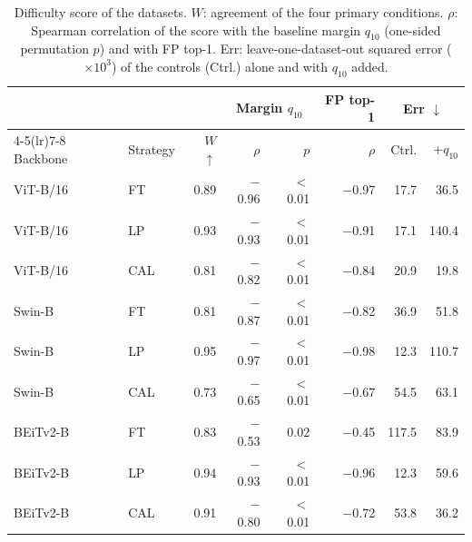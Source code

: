 \begin{table}[t]
\centering
\caption{Difficulty score of the {} datasets. $W$: agreement of the four primary conditions. $\rho$: Spearman correlation of the score with the baseline margin $q_{10}$ (one-sided permutation $p$) and with FP top-1. Err: leave-one-dataset-out squared error ($\times 10^{3}$) of the controls (Ctrl.) alone and with $q_{10}$ added.}
\label{tab:gates}
\setlength{\tabcolsep}{1.8pt}
\small
\begin{tabular}{llrrrrrr}
\toprule
 & & & \multicolumn{2}{c}{Margin $q_{10}$} & FP top-1 & \multicolumn{2}{c}{Err $\downarrow$} \\
\cmidrule(lr){4-5}\cmidrule(lr){7-8}
Backbone & Strategy & $W$ $\uparrow$ & $\rho$ & $p$ & $\rho$ & Ctrl. & +$q_{10}$ \\
\midrule
ViT-B/16 & FT & 0.89 & $-$0.96 & $<$0.01 & $-$0.97 & 17.7 & 36.5 \\
ViT-B/16 & LP & 0.93 & $-$0.93 & $<$0.01 & $-$0.91 & 17.1 & 140.4 \\
ViT-B/16 & CAL & 0.81 & $-$0.82 & $<$0.01 & $-$0.84 & 20.9 & 19.8 \\
Swin-B & FT & 0.81 & $-$0.87 & $<$0.01 & $-$0.82 & 36.9 & 51.8 \\
Swin-B & LP & 0.95 & $-$0.97 & $<$0.01 & $-$0.98 & 12.3 & 110.7 \\
Swin-B & CAL & 0.73 & $-$0.65 & $<$0.01 & $-$0.67 & 54.5 & 63.1 \\
BEiTv2-B & FT & 0.83 & $-$0.53 & 0.02 & $-$0.45 & 117.5 & 83.9 \\
BEiTv2-B & LP & 0.94 & $-$0.93 & $<$0.01 & $-$0.96 & 12.3 & 59.6 \\
BEiTv2-B & CAL & 0.91 & $-$0.80 & $<$0.01 & $-$0.72 & 53.8 & 36.2 \\
\bottomrule
\end{tabular}
\end{table}
